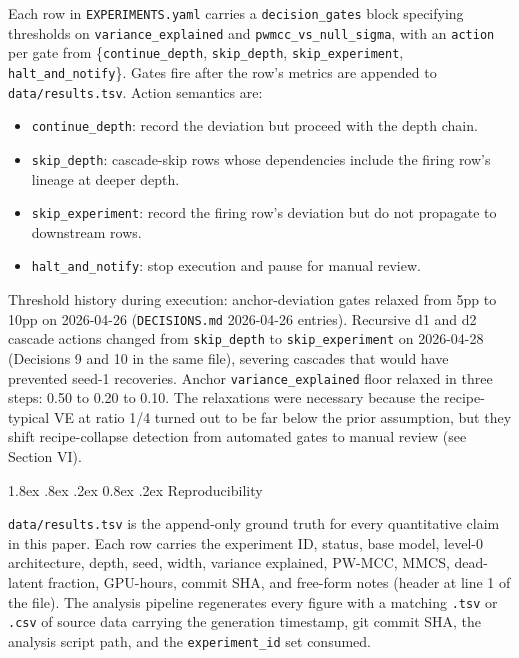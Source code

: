\documentclass[conference]{IEEEtran}
\makeatletter
\renewcommand\subsection{\@startsection{subsection}{2}{\z@}%
   {1.8ex \@plus .8ex \@minus .2ex}%
   {0.8ex \@plus .2ex}%
   {\normalfont\large\bfseries}}
\providecommand{\tightlist}{%
  \setlength{\itemsep}{0pt}\setlength{\parskip}{0pt}}
\makeatother
\begin{document}
Each row in \texttt{EXPERIMENTS.yaml} carries a \texttt{decision\_gates}
block specifying thresholds on \texttt{variance\_explained} and
\texttt{pwmcc\_vs\_null\_sigma}, with an \texttt{action} per gate from
\{\texttt{continue\_depth}, \texttt{skip\_depth},
\texttt{skip\_experiment}, \texttt{halt\_and\_notify}\}. Gates fire
after the row's metrics are appended to \texttt{data/results.tsv}.
Action semantics are:

\begin{itemize}
\tightlist
\item
  \texttt{continue\_depth}: record the deviation but proceed with the
  depth chain.
\item
  \texttt{skip\_depth}: cascade-skip rows whose dependencies include the
  firing row's lineage at deeper depth.
\item
  \texttt{skip\_experiment}: record the firing row's deviation but do
  not propagate to downstream rows.
\item
  \texttt{halt\_and\_notify}: stop execution and pause for manual
  review.
\end{itemize}

Threshold history during execution: anchor-deviation gates relaxed from
5pp to 10pp on 2026-04-26 (\texttt{DECISIONS.md} 2026-04-26 entries).
Recursive d1 and d2 cascade actions changed from \texttt{skip\_depth} to
\texttt{skip\_experiment} on 2026-04-28 (Decisions 9 and 10 in the same
file), severing cascades that would have prevented seed-1 recoveries.
Anchor \texttt{variance\_explained} floor relaxed in three steps: 0.50
to 0.20 to 0.10. The relaxations were necessary because the
recipe-typical VE at ratio 1/4 turned out to be far below the prior
assumption, but they shift recipe-collapse detection from automated
gates to manual review (see Section VI).

\hypertarget{d.-reproducibility}{%
\subsection{Reproducibility}\label{d.-reproducibility}}

\texttt{data/results.tsv} is the append-only ground truth for every
quantitative claim in this paper. Each row carries the experiment ID,
status, base model, level-0 architecture, depth, seed, width, variance
explained, PW-MCC, MMCS, dead-latent fraction, GPU-hours, commit SHA,
and free-form notes (header at line 1 of the file). The analysis
pipeline regenerates every figure with a matching \texttt{.tsv} or
\texttt{.csv} of source data carrying the generation timestamp, git
commit SHA, the analysis script path, and the \texttt{experiment\_id}
set consumed.
\end{document}
